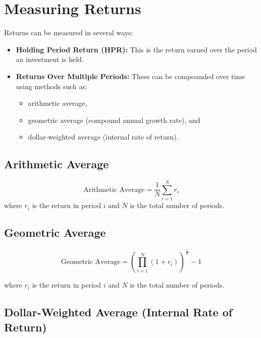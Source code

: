 \documentclass[
]{book}
\providecommand{\tightlist}{%
  \setlength{\itemsep}{0pt}\setlength{\parskip}{0pt}}
\begin{document}
\hypertarget{measuring-returns}{%
\section{Measuring Returns}\label{measuring-returns}}

Returns can be measured in several ways:

\begin{itemize}
\tightlist
\item
  \textbf{Holding Period Return (HPR):} This is the return earned over the period an investment is held.
\item
  \textbf{Returns Over Multiple Periods:} These can be compounded over time using methods such as:

  \begin{itemize}
  \tightlist
  \item
    arithmetic average,
  \item
    geometric average (compound annual growth rate), and
  \item
    dollar-weighted average (internal rate of return).
  \end{itemize}
\end{itemize}

\hypertarget{arithmetic-average}{%
\subsection{Arithmetic Average}\label{arithmetic-average}}

\[ \text{Arithmetic Average} = \frac{1}{N} \sum_{i=1}^{N} r_i \]
where \(r_i\) is the return in period \(i\) and \(N\) is the total number of periods.

\hypertarget{geometric-average}{%
\subsection{Geometric Average}\label{geometric-average}}

\[ \text{Geometric Average} = \left( \prod_{i=1}^{N} (1 + r_i) \right)^{\frac{1}{N}} - 1 \]

where \(r_i\) is the return in period \(i\) and \(N\) is the total number of periods.

\hypertarget{dollar-weighted-average-internal-rate-of-return}{%
\subsection{Dollar-Weighted Average (Internal Rate of Return)}\label{dollar-weighted-average-internal-rate-of-return}}
\end{document}
